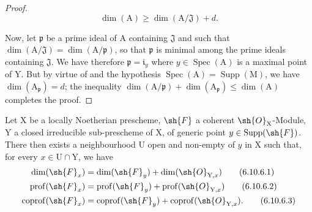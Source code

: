 \begin{proof}
\[
\dim(\mathrm{A})\geqslant\dim(\mathrm{A}/\mathfrak{J})+d.
\]

Now, let $\mathfrak{p}$ be a prime ideal of $\mathrm{A}$ containing $\mathfrak{J}$ and such that $\dim(\mathrm{A}/\mathfrak{J})=\dim(\mathrm{A}/\mathfrak{p})$, so that $\mathfrak{p}$ is minimal among the prime ideals containing $\mathfrak{J}$. We have therefore $\mathfrak{p}=\mathfrak{i}_y$ where $y\in\operatorname{Spec}(\mathrm{A})$ is a maximal point of $\mathrm{Y}$. But by virtue of  and the hypothesis $\operatorname{Spec}(\mathrm{A})=\operatorname{Supp}(\mathrm{M})$, we have $\dim(\mathrm{A}_\mathfrak{p})=d$; the inequality $\dim(\mathrm{A}/\mathfrak{p})+\dim(\mathrm{A}_\mathfrak{p})\leqslant\dim(\mathrm{A})$  completes the proof.
\end{proof}

\begin{proposition}[6.10.6]
\label{IV.6.10.6}
Let $\mathrm{X}$ be a locally Noetherian prescheme, $\sh{F}$ a coherent $\sh{O}_\mathrm{X}$-Module, $\mathrm{Y}$ a closed irreducible sub-prescheme of $\mathrm{X}$, of generic point $y\in\operatorname{Supp}(\sh{F})$. There then exists a neighbourhood $\mathrm{U}$ open and non-empty of $y$ in $\mathrm{X}$ such that, for every $x\in\mathrm{U}\cap\mathrm{Y}$, we have
\begin{align}
  \dim(\sh{F}_x) &= \dim(\sh{F}_y)+\dim(\sh{O}_{\mathrm{Y},x}) \tag{6.10.6.1}\label{IV.6.10.6.1}\\
  \operatorname{prof}(\sh{F}_x) &= \operatorname{prof}(\sh{F}_y)+\operatorname{prof}(\sh{O}_{\mathrm{Y},x}) \tag{6.10.6.2}\label{IV.6.10.6.2}\\
  \operatorname{coprof}(\sh{F}_x) &= \operatorname{coprof}(\sh{F}_y)+\operatorname{coprof}(\sh{O}_{\mathrm{Y},x}). \tag{6.10.6.3}\label{IV.6.10.6.3}
\end{align}
\end{proposition}

